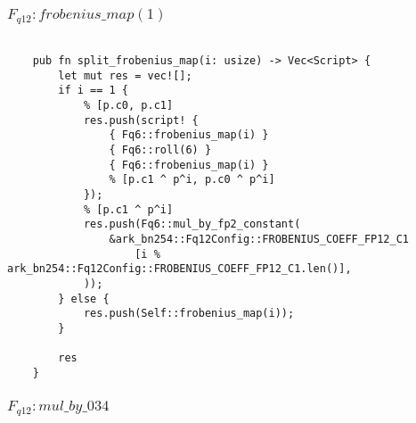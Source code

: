 \subsubsection{$F_{q12} : frobenius\_map(1)$}

\begin{lstlisting}

    pub fn split_frobenius_map(i: usize) -> Vec<Script> {
        let mut res = vec![];
        if i == 1 {
            % [p.c0, p.c1]
            res.push(script! {
                { Fq6::frobenius_map(i) }
                { Fq6::roll(6) }
                { Fq6::frobenius_map(i) }
                % [p.c1 ^ p^i, p.c0 ^ p^i]
            });
            % [p.c1 ^ p^i]
            res.push(Fq6::mul_by_fp2_constant(
                &ark_bn254::Fq12Config::FROBENIUS_COEFF_FP12_C1
                    [i % ark_bn254::Fq12Config::FROBENIUS_COEFF_FP12_C1.len()],
            ));
        } else {
            res.push(Self::frobenius_map(i));
        }

        res
    }
\end{lstlisting}

\subsubsection{$F_{q12}: mul\_by\_034$}

